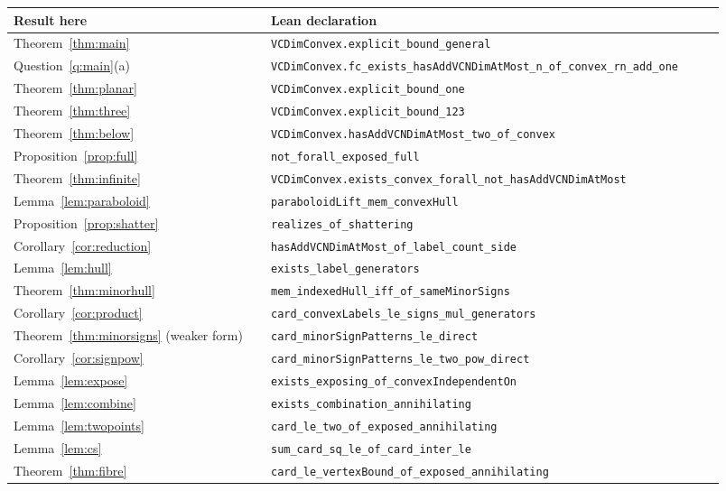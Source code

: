 \documentclass[11pt,a4paper]{article}
\theoremstyle{plain}
\theoremstyle{definition}
\newcommand{\lean}[1]{\texttt{\footnotesize #1}}
\begin{document}
\begin{center}
\small
\begin{longtable}{@{}p{0.34\linewidth}p{0.60\linewidth}@{}}
\toprule
\textbf{Result here} & \textbf{Lean declaration} \\
\midrule
\endhead
Theorem~\ref{thm:main} & \lean{VCDimConvex.explicit\_bound\_general} \\
Question~\ref{q:main}(a) & \lean{VCDimConvex.fc\_exists\_\allowbreak hasAddVCNDimAtMost\_\allowbreak n\_of\_convex\_rn\_add\_one} \\
Theorem~\ref{thm:planar} & \lean{VCDimConvex.explicit\_bound\_one} \\
Theorem~\ref{thm:three} & \lean{VCDimConvex.explicit\_bound\_123} \\
Theorem~\ref{thm:below} & \lean{VCDimConvex.hasAddVCNDimAtMost\_\allowbreak two\_of\_convex} \\
Proposition~\ref{prop:full} & \lean{not\_forall\_exposed\_full} \\
Theorem~\ref{thm:infinite} & \lean{VCDimConvex.exists\_convex\_\allowbreak forall\_not\_\allowbreak hasAddVCNDimAtMost} \\
Lemma~\ref{lem:paraboloid} & \lean{paraboloidLift\_mem\_convexHull} \\
Proposition~\ref{prop:shatter} & \lean{realizes\_of\_shattering} \\
Corollary~\ref{cor:reduction} & \lean{hasAddVCNDimAtMost\_of\_label\_count\_side} \\
Lemma~\ref{lem:hull} & \lean{exists\_label\_generators} \\
Theorem~\ref{thm:minorhull} & \lean{mem\_indexedHull\_iff\_of\_sameMinorSigns} \\
Corollary~\ref{cor:product} & \lean{card\_convexLabels\_le\_signs\_mul\_generators} \\
Theorem~\ref{thm:minorsigns} (weaker form) & \lean{card\_minorSignPatterns\_le\_direct} \\
Corollary~\ref{cor:signpow} & \lean{card\_minorSignPatterns\_le\_two\_pow\_direct} \\
Lemma~\ref{lem:expose} & \lean{exists\_exposing\_of\_convexIndependentOn} \\
Lemma~\ref{lem:combine} & \lean{exists\_combination\_annihilating} \\
Lemma~\ref{lem:twopoints} & \lean{card\_le\_two\_of\_exposed\_annihilating} \\
Lemma~\ref{lem:cs} & \lean{sum\_card\_sq\_le\_of\_card\_inter\_le} \\
Theorem~\ref{thm:fibre} & \lean{card\_le\_vertexBound\_of\_exposed\_annihilating} \\

\end{longtable}
\end{center}
\end{document}
